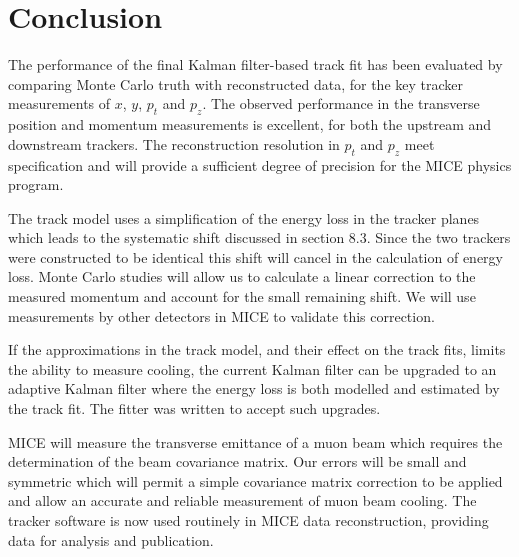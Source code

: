 \section{Conclusion}
\label{sec:Conclusion}
The performance of the final Kalman filter-based track fit has been evaluated by comparing Monte Carlo truth with reconstructed data, for the key tracker measurements of $x$, $y$, $p_{t}$ and $p_z$.  The observed performance in the transverse position and momentum measurements is excellent, for both the upstream and downstream trackers. The reconstruction resolution in $p_t$ and $p_z$ meet specification and will provide a sufficient degree of precision for the MICE physics program. 

The track model uses a simplification of the energy loss in the tracker planes which leads to the systematic shift discussed in section 8.3. Since the two trackers were constructed to be identical this shift will cancel in the calculation of energy loss. Monte Carlo studies will allow us to calculate a linear correction to the measured momentum and account for the small remaining shift. We will use measurements by other detectors in MICE to validate this correction.

If the approximations in the track model, and their effect on the track fits, limits the ability to measure cooling, the current Kalman filter can be upgraded to an adaptive Kalman filter where the energy loss is both modelled and estimated by the track fit. The fitter was written to accept such upgrades.

MICE will measure the transverse emittance of a muon beam which requires the determination of the beam covariance matrix. Our errors will be small and symmetric which will permit a simple covariance matrix correction to be applied and allow an accurate and reliable measurement of muon beam cooling. The tracker software is now used routinely in MICE data reconstruction, providing data for analysis and publication.


